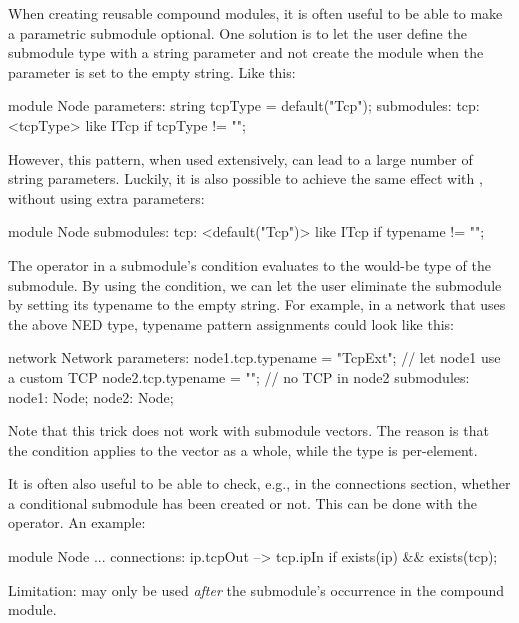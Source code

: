 When creating reusable compound modules, it is often useful to be able to make a
parametric submodule optional. One solution is to let the user define the
submodule type with a string parameter and not create the module when the
parameter is set to the empty string. Like this:

\begin{ned}
module Node
{
    parameters:
        string tcpType = default("Tcp");
    submodules:
        tcp: <tcpType> like ITcp if tcpType != "";
}
\end{ned}

However, this pattern, when used extensively, can lead to a large number of
string parameters. Luckily, it is also possible to achieve the same effect with
, without using extra parameters:

\begin{ned}
module Node
{
    submodules:
        tcp: <default("Tcp")> like ITcp if typename != "";
}
\end{ned}

The  operator in a submodule's  condition
evaluates to the would-be type of the submodule. By using the  condition, we can let the user eliminate the  submodule by setting
its typename to the empty string. For example, in a network that uses the above
NED type, typename pattern assignments could look like this:

\begin{ned}
network Network
{
    parameters:
        node1.tcp.typename = "TcpExt"; // let node1 use a custom TCP
        node2.tcp.typename = ""; // no TCP in node2
    submodules:
        node1: Node;
        node2: Node;
}
\end{ned}

Note that this trick does not work with submodule vectors. The reason is that
the condition applies to the vector as a whole, while the type is per-element.

It is often also useful to be able to check, e.g., in the connections section,
whether a conditional submodule has been created or not. This can be done with
the  operator. An example:

\begin{ned}
module Node
{
    ...
    connections:
        ip.tcpOut --> tcp.ipIn if exists(ip) && exists(tcp);
}
\end{ned}

Limitation:  may only be used \textit{after} the submodule's
occurrence in the compound module.




